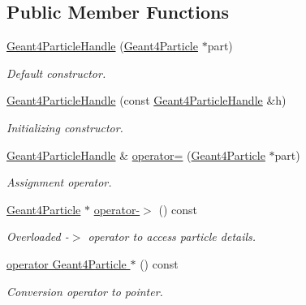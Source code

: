\subsection*{Public Member Functions}
\begin{DoxyCompactItemize}
\item 
\hyperlink{class_d_d4hep_1_1_simulation_1_1_geant4_particle_handle_aae0f6cff704f2f70a13941b9d9d2b590}{Geant4\+Particle\+Handle} (\hyperlink{class_d_d4hep_1_1_simulation_1_1_geant4_particle}{Geant4\+Particle} $\ast$part)
\begin{DoxyCompactList}\small\item\em Default constructor. \end{DoxyCompactList}\item 
\hyperlink{class_d_d4hep_1_1_simulation_1_1_geant4_particle_handle_a8e62699ff44968d5f8b9926a5512450f}{Geant4\+Particle\+Handle} (const \hyperlink{class_d_d4hep_1_1_simulation_1_1_geant4_particle_handle}{Geant4\+Particle\+Handle} \&h)
\begin{DoxyCompactList}\small\item\em Initializing constructor. \end{DoxyCompactList}\item 
\hyperlink{class_d_d4hep_1_1_simulation_1_1_geant4_particle_handle}{Geant4\+Particle\+Handle} \& \hyperlink{class_d_d4hep_1_1_simulation_1_1_geant4_particle_handle_a127942c2338b44ef36f9f8eae2845b63}{operator=} (\hyperlink{class_d_d4hep_1_1_simulation_1_1_geant4_particle}{Geant4\+Particle} $\ast$part)
\begin{DoxyCompactList}\small\item\em Assignment operator. \end{DoxyCompactList}\item 
\hyperlink{class_d_d4hep_1_1_simulation_1_1_geant4_particle}{Geant4\+Particle} $\ast$ \hyperlink{class_d_d4hep_1_1_simulation_1_1_geant4_particle_handle_a2e94d6191b35b83662dba100a5b24b0d}{operator-\/$>$} () const
\begin{DoxyCompactList}\small\item\em Overloaded -\/$>$ operator to access particle details. \end{DoxyCompactList}\item 
\hyperlink{class_d_d4hep_1_1_simulation_1_1_geant4_particle_handle_a0b41fbcc357633d0a56348a41f067d1b}{operator Geant4\+Particle $\ast$} () const
\begin{DoxyCompactList}\small\item\em Conversion operator to pointer. \end{DoxyCompactList}\item 

\end{DoxyCompactItemize}
